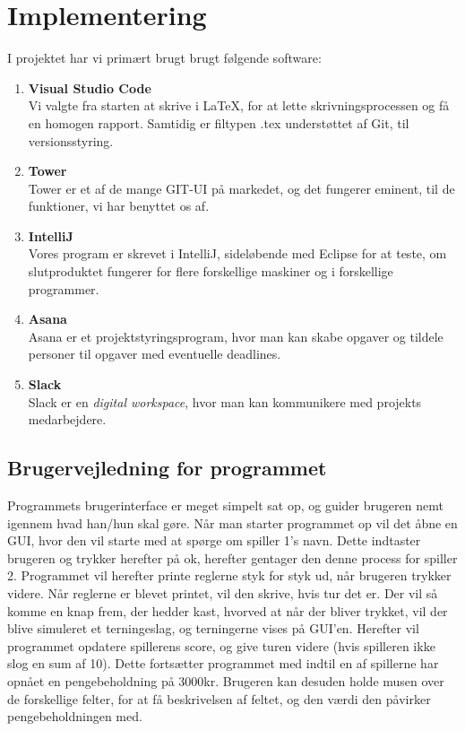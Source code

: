 \chapter{Implementering}
I projektet har vi primært brugt brugt følgende software:
\begin{enumerate}
    \item \textbf{Visual Studio Code}
    \\ Vi valgte fra starten at skrive i LaTeX, for at lette skrivningsprocessen og få en homogen rapport.
    Samtidig er filtypen .tex understøttet af Git, til versionsstyring.
    \item \textbf{Tower}
    \\Tower er et af de mange GIT-UI på markedet, og det fungerer eminent, til de funktioner, vi har benyttet os af.
    \item \textbf{IntelliJ}
    \\Vores program er skrevet i IntelliJ, sideløbende med Eclipse for at teste, om slutproduktet fungerer for flere forskellige maskiner og i forskellige programmer.
    \item \textbf{Asana}
    \\Asana er et projektstyringsprogram, hvor man kan skabe opgaver og tildele personer til opgaver med eventuelle deadlines.
    \item \textbf{Slack}
    \\Slack er en \textit{digital workspace}, hvor man kan kommunikere med projekts medarbejdere.
\end{enumerate}
\section{Brugervejledning for programmet}
Programmets brugerinterface er meget simpelt sat op, og guider brugeren nemt igennem hvad han/hun skal gøre. Når man starter programmet op vil det åbne en GUI, hvor den vil starte med at spørge om spiller 1's navn. Dette indtaster brugeren og trykker herefter på ok, herefter gentager den denne process for spiller 2. Programmet vil herefter printe reglerne styk for styk ud, når brugeren trykker videre. Når reglerne er blevet printet, vil den skrive, hvis tur det er. Der vil så komme en knap frem, der hedder kast, hvorved at når der bliver trykket, vil der blive simuleret et terningeslag, og terningerne vises på GUI'en. Herefter vil programmet opdatere spillerens score, og give turen videre (hvis spilleren ikke slog en sum af 10). Dette fortsætter programmet med indtil en af spillerne har opnået en pengebeholdning på 3000kr. Brugeren kan desuden holde musen over de forskellige felter, for at få beskrivelsen af feltet, og den værdi den påvirker pengebeholdningen med.
